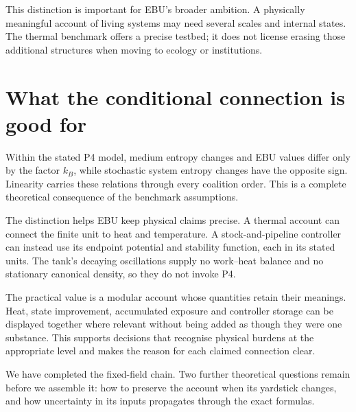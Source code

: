 This distinction is important for EBU's broader ambition. A physically meaningful account of living systems may need several scales and internal states. The thermal benchmark offers a precise testbed; it does not license erasing those additional structures when moving to ecology or institutions.

\section{What the conditional connection is good for}
Within the stated P4 model, medium entropy changes and EBU values differ only by the factor $k_B$, while stochastic system entropy changes have the opposite sign. Linearity carries these relations through every coalition order. This is a complete theoretical consequence of the benchmark assumptions.

The distinction helps EBU keep physical claims precise. A thermal account can connect the finite unit to heat and temperature. A stock-and-pipeline controller can instead use its endpoint potential and stability function, each in its stated units. The tank's decaying oscillations supply no work--heat balance and no stationary canonical density, so they do not invoke P4.

The practical value is a modular account whose quantities retain their meanings. Heat, state improvement, accumulated exposure and controller storage can be displayed together where relevant without being added as though they were one substance. This supports decisions that recognise physical burdens at the appropriate level and makes the reason for each claimed connection clear.

We have completed the fixed-field chain. Two further theoretical questions remain before we assemble it: how to preserve the account when its yardstick changes, and how uncertainty in its inputs propagates through the exact formulas.
